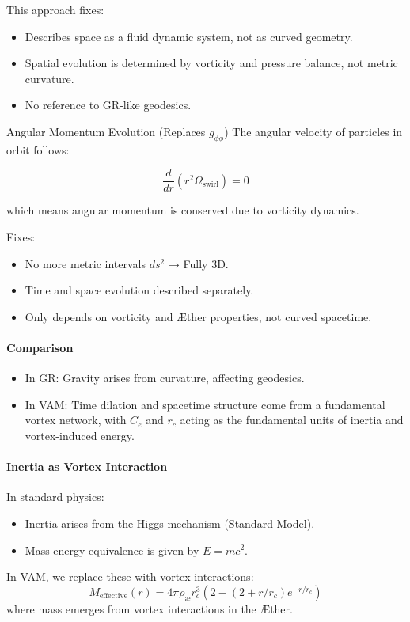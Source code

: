 \documentclass[a4paper,10pt]{article}
\begin{document}
This approach fixes:

\begin{itemize}
\item Describes space as a fluid dynamic system, not as curved geometry.
\item Spatial evolution is determined by vorticity and pressure balance, not metric curvature.
\item No reference to GR-like geodesics.
\end{itemize}


Angular Momentum Evolution (Replaces $g_{\phi\phi}$)
The angular velocity of particles in orbit follows:

\begin{equation*}
    \frac{d}{dr} \left( r^2 \Omega_\text{swirl} \right) = 0
\end{equation*}

which means angular momentum is conserved due to vorticity dynamics.

Fixes:

\begin{itemize}
\item No more metric intervals $ ds^2 $ → Fully 3D.
\item Time and space evolution described separately.
\item Only depends on vorticity and Æther properties, not curved spacetime.
\end{itemize}



\paragraph{Comparison}
\begin{itemize}
    \item In GR: Gravity arises from curvature, affecting geodesics.
    \item In VAM: Time dilation and spacetime structure come from a fundamental vortex network, with $C_e$ and $r_c$ acting as the fundamental units of inertia and vortex-induced energy.
\end{itemize}

\paragraph{Inertia as Vortex Interaction}
In standard physics:
\begin{itemize}
    \item Inertia arises from the Higgs mechanism (Standard Model).
    \item Mass-energy equivalence is given by $E = mc^2$.
\end{itemize}
In VAM, we replace these with vortex interactions:
\begin{equation*}
    M_\text{effective}(r) = 4\pi \rho_\text{\ae} r_c^3 \left( 2 - (2 + r/r_c) e^{-r / r_c} \right)
\end{equation*}
where mass emerges from vortex interactions in the Æther.
\end{document}
